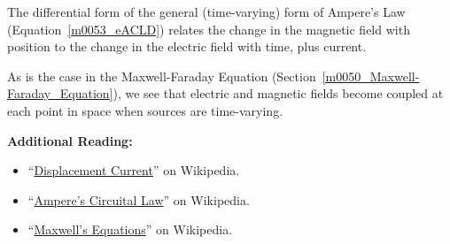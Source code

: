 \begin{mdframed}[backgroundcolor=yellow!20,nobreak=true] 
The differential form of the general (time-varying) form of Ampere's Law (Equation~\ref{m0053_eACLD}) relates the change in the magnetic field with position to the change in the electric field with time, plus current.
\end{mdframed}

As is the case in the Maxwell-Faraday Equation (Section~\ref{m0050_Maxwell-Faraday_Equation}), we see that electric and magnetic fields become coupled at each point in space when sources are time-varying. 


{\bf Additional Reading:}
\begin{itemize}
\item ``\href{https://en.wikipedia.org/wiki/Displacement_current}{Displacement Current}'' on Wikipedia.
\item ``\href{https://en.wikipedia.org/wiki/Ampere's_circuital_law}{Ampere's Circuital Law}'' on Wikipedia.
\item ``\href{https://en.wikipedia.org/wiki/Maxwell's_equations}{Maxwell's Equations}'' on Wikipedia.
\end{itemize}



